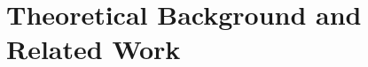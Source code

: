 \chapter{Theoretical Background and Related Work}
\label{chap:background}
\label{chap:theoretical_background}





% 
% 
% 
% 
% 
